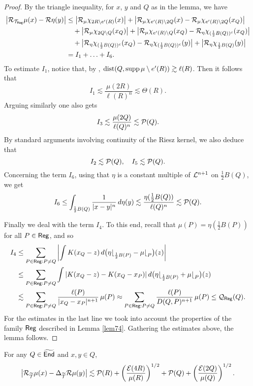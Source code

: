 \begin{proof}
By the triangle inequality, for $x$, $y$ and $Q$ as in the lemma, we have
\begin{align*}
\big|{\mathcal R}_{{\mathcal T}_{\mathsf{Reg}}}\mu(x) - {\mathcal R}\eta(y)\big| & \leq \big|{\mathcal R}_\mu\chi_{2R\setminus e'(R)}(x)\big| 
+ \big|{\mathcal R}_\mu\chi_{e'(R)\setminus 2Q}(x) - {\mathcal R}_\mu\chi_{e'(R)\setminus 2Q}(x_Q)\big|\\
& \quad 
+ \big|{\mathcal R}_\mu\chi_{2Q\setminus Q}(x_Q)\big| 
+\big|{\mathcal R}_\mu\chi_{e'(R)\setminus Q}(x_Q) - {\mathcal R}_\eta \chi_{(\frac12B(Q))^c}(x_Q)\big|\\
&\quad + \big|{\mathcal R}_\eta \chi_{(\frac12B(Q))^c}(x_Q) - {\mathcal R}_\eta \chi_{(\frac12B(Q))^c}(y)\big| + \big|{\mathcal R}_\eta \chi_{\frac12B(Q)}(y)\big|\\
& = I_1+ \ldots + I_6.
\end{align*}
To estimate $I_1$, notice that, by , ${\rm dist}(Q,\operatorname{supp}\mu\setminus e'(R))\gtrsim\ell(R)$.
Then it follows that
$$I_1\lesssim \frac{\mu(2R)}{\ell(R)^n} \lesssim \Theta(R).$$
Arguing similarly one also gets 
\begin{equation*}
	I_3\lesssim \frac{\mu(2Q)}{\ell(Q)^n}\lesssim {\mathcal P}(Q).
\end{equation*}
By standard arguments involving continuity of the Riesz kernel, we also deduce that
$$I_2\lesssim{\mathcal P}(Q),\quad I_5\lesssim{\mathcal P}(Q).$$
Concerning the term $I_6$, using that $\eta$ is a constant multiple of ${\mathcal L}^{n+1}$ on 
$\frac12B(Q)$, we get
$$I_6\leq \int_{\frac12B(Q)}\frac1{|x-y|^n}\,d\eta(y)\lesssim \frac{\eta(\tfrac12B(Q))}{\ell(Q)^n}
\lesssim {\mathcal P}(Q).$$

Finally we deal with the term $I_4$. To this end, recall that $\mu(P) = \eta(\frac12B(P))$ for all 
$P\in {\mathsf{Reg}}$, and so
\begin{align*}
I_4 & \leq \sum_{P\in{\mathsf{Reg}}:P\neq Q} \left| \int K(x_Q-z)\,d\big(\eta{\lfloor}_{\frac12B(P)} - \mu{\lfloor}_P\big)(z)\right|\\
& \leq \sum_{P\in{\mathsf{Reg}}:P\neq Q}  \int |K(x_Q-z)-K(x_Q-x_P)|\,d\big(\eta{\lfloor}_{\frac12B(P)} + \mu{\lfloor}_P\big)(z)\\
& \lesssim \sum_{P\in{\mathsf{Reg}}:P\neq Q} \frac{\ell(P)}{|x_Q-x_P|^{n+1}}\,\mu(P)\approx \sum_{P\in{\mathsf{Reg}}:P\neq Q} \frac{\ell(P)}{D(Q,P)^{n+1}}\,\mu(P) \leq {\mathcal Q}_{\mathsf{Reg}}(Q). 
\end{align*}
For the estimates in the last line we took into account the properties of the family ${\mathsf{Reg}}$ described 
in Lemma \ref{lem74}.
Gathering the estimates above, the lemma follows.
\end{proof}


\vv
\begin{lemma}\label{lemaprox2}
For any $Q\in{\widetilde{{\mathsf{End}}}}$ and $x,y\in Q$,
$$\big|{\mathcal R}_{{\widetilde{{\mathcal T}}}}\mu(x) - \Delta_{{\widetilde{{\mathcal T}}}}{\mathcal R}\mu(y)\big| \lesssim {\mathcal P}(R) + \left(\frac{{\mathcal E}(4R)}{\mu(R)}\right)^{1/2} + {\mathcal P}(Q) +  \left(\frac{{\mathcal E}(2Q)}{\mu(Q)}\right)^{1/2}.$$
\end{lemma}

